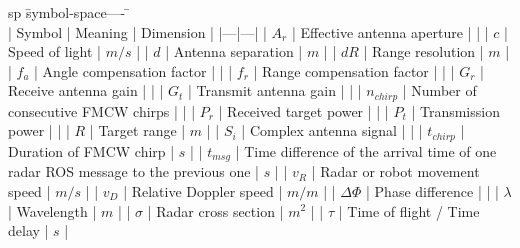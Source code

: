 \begin{listofsymbols}
\begin{tabbing}
sp	\= symbol-space---- \= \kill \+ \\

| Symbol | Meaning | Dimension |
|---|---|
| $A_r$ | Effective antenna aperture |  |
| $c$ | Speed of light | $m/s$ |
| $d$ | Antenna separation | $m$ |
| $dR$ | Range resolution | $m$ |
| $f_a$ | Angle compensation factor | |
| $f_r$ | Range compensation factor | |
| $G_r$ | Receive antenna gain |  |
| $G_t$ | Transmit antenna gain |  |
| $n_{chirp}$ | Number of consecutive FMCW chirps | |
| $P_r$ | Received target power |  |
| $P_t$ | Transmission power |  |
| $R$ | Target range | $m$ |
| $S_i$ | Complex antenna signal | |
| $t_{chirp}$ | Duration of FMCW chirp | $s$ |
| $t_{msg}$ | Time difference of the arrival time of one radar ROS message to the previous one | $s$ |
| $v_R$ | Radar or robot movement speed | $m/s$ |
| $v_D$ | Relative Doppler speed | $m/m$ |
| $\Delta\Phi$ | Phase difference | |
| $\lambda$ | Wavelength | $m$ |
| $\sigma$ | Radar cross section | $m^2$ |
| $\tau$ | Time of flight / Time delay | $s$ |

\end{tabbing}
\end{listofsymbols}